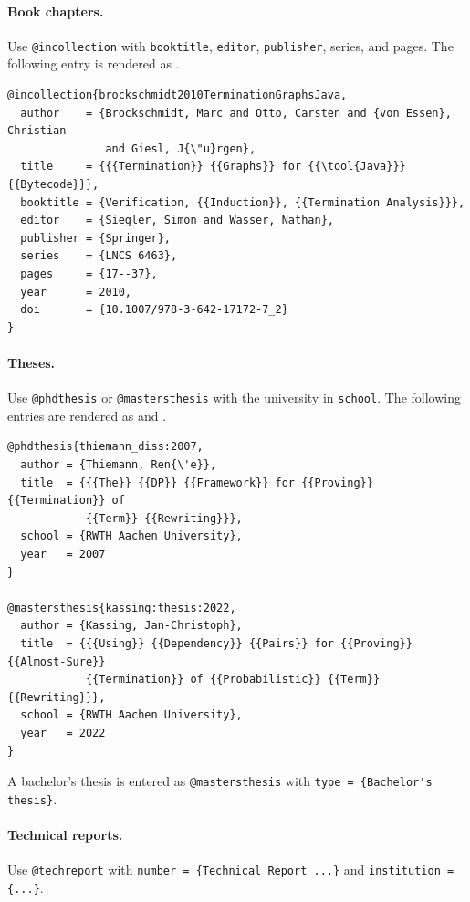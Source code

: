 \paragraph{Book chapters.}
Use \lstinline|@incollection| with \lstinline|booktitle|, \lstinline|editor|,
\lstinline|publisher|, series, and pages.
The following entry is rendered as \cite{brockschmidt2010TerminationGraphsJava}.

\begin{lstlisting}
@incollection{brockschmidt2010TerminationGraphsJava,
  author    = {Brockschmidt, Marc and Otto, Carsten and {von Essen}, Christian
               and Giesl, J{\"u}rgen},
  title     = {{{Termination}} {{Graphs}} for {{\tool{Java}}} {{Bytecode}}},
  booktitle = {Verification, {{Induction}}, {{Termination Analysis}}},
  editor    = {Siegler, Simon and Wasser, Nathan},
  publisher = {Springer},
  series    = {LNCS 6463},
  pages     = {17--37},
  year      = 2010,
  doi       = {10.1007/978-3-642-17172-7_2}
}
\end{lstlisting}

\paragraph{Theses.}
Use \lstinline|@phdthesis| or \lstinline|@mastersthesis| with the university
in \lstinline|school|.
The following entries are rendered as \cite{thiemann_diss:2007} and
\cite{kassing:thesis:2022}.

\begin{lstlisting}
@phdthesis{thiemann_diss:2007,
  author = {Thiemann, Ren{\'e}},
  title  = {{{The}} {{DP}} {{Framework}} for {{Proving}} {{Termination}} of
            {{Term}} {{Rewriting}}},
  school = {RWTH Aachen University},
  year   = 2007
}

@mastersthesis{kassing:thesis:2022,
  author = {Kassing, Jan-Christoph},
  title  = {{{Using}} {{Dependency}} {{Pairs}} for {{Proving}} {{Almost-Sure}}
            {{Termination}} of {{Probabilistic}} {{Term}} {{Rewriting}}},
  school = {RWTH Aachen University},
  year   = 2022
}
\end{lstlisting}

A bachelor's thesis is entered as \lstinline|@mastersthesis| with
\lstinline|type = {Bachelor's thesis}|.

\paragraph{Technical reports.}
Use \lstinline|@techreport| with \lstinline|number = {Technical Report ...}|
and \lstinline|institution = {...}|.


